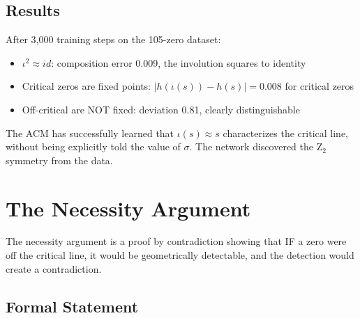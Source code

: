 \documentclass[11pt,a4paper]{article}
\begin{document}
\subsection{Results}

After 3,000 training steps on the 105-zero dataset:

\begin{itemize}[nosep]
\item $\iota^2 \approx id$: composition error 0.009, the involution squares to identity
\item Critical zeros are fixed points: $|h(\iota(s)) - h(s)| = 0.008$ for critical zeros
\item Off-critical are NOT fixed: deviation 0.81, clearly distinguishable
\end{itemize}

The ACM has successfully learned that $\iota(s) \approx s$ characterizes the critical line, without being explicitly told the value of $\sigma$. The network discovered the Z$_2$ symmetry from the data.

\section{The Necessity Argument}\label{sec:necessity}

The necessity argument is a proof by contradiction showing that IF a zero were off the critical line, it would be geometrically detectable, and the detection would create a contradiction.

\subsection{Formal Statement}
\end{document}
